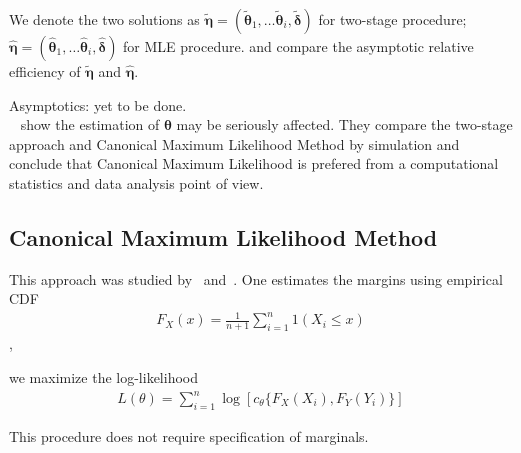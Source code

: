 We denote the two solutions as
$\tilde{\pmb{\eta}} = (\pmb{\tilde{\theta}}_1,\dots \pmb{\tilde{\theta}}_i, \pmb{\tilde{\delta}})$ for two-stage procedure;
$\hat{\pmb{\eta}} =(\pmb{\hat{\theta}}_1,\dots \pmb{\hat{\theta}}_i, \pmb{\hat{\delta}})$ for MLE procedure.
and compare the asymptotic relative efficiency of $\tilde{\pmb{\eta}}$ and $\hat{\pmb{\eta}}$.

Asymptotics: yet to be done.\\
~\cite{kim2007comparison} show the estimation of $\pmb{\theta}$ may be seriously affected.
They compare the two-stage approach and Canonical Maximum Likelihood Method by simulation and
conclude that Canonical Maximum Likelihood is prefered from a computational statistics and data analysis point of view.

\subsection{Canonical Maximum Likelihood Method}\label{subsec:canonical-maximum-likelihood-method}
This approach was studied by~\cite{genest1995semiparametric} and~\cite{shih1995inferences}.
One estimates the margins using empirical CDF
\begin{align}F_X(x)=\frac{1}{n+1}\sum_{i=1}^n 1(X_i \leq x)\end{align},

we maximize the log-likelihood
\begin{align}
    L(\theta) = \sum_{i=1}^n \log [c_\theta \{F_X(X_i), F_Y(Y_i)\}]
    \end{align}

This procedure does not require specification of marginals.





%
%
%
